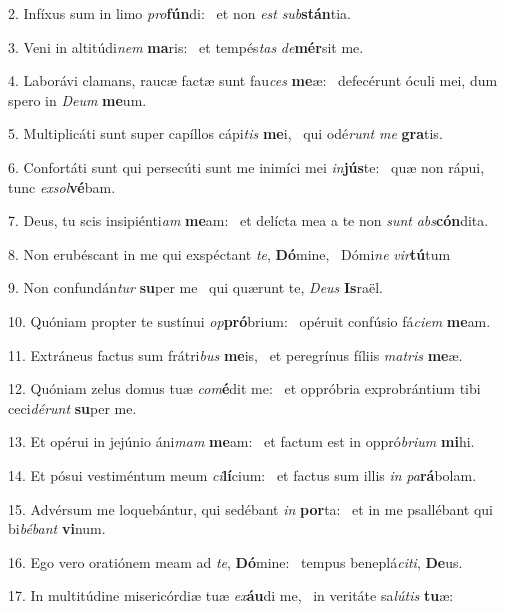 2. Infíxus sum in limo \textit{pro}\textbf{fún}di: \ast\  et non \textit{est} \textit{sub}\textbf{stán}tia.\

3. Veni in altitúdi\textit{nem} \textbf{ma}ris: \ast\  et tempés\textit{tas} \textit{de}\textbf{mér}sit me.\

4. Laborávi clamans, raucæ factæ sunt fau\textit{ces} \textbf{me}æ: \ast\  defecérunt óculi mei, dum spero in \textit{De}\textit{um} \textbf{me}um.\

5. Multiplicáti sunt super capíllos cápi\textit{tis} \textbf{me}i, \ast\  qui odé\textit{runt} \textit{me} \textbf{gra}tis.\

6. Confortáti sunt qui persecúti sunt me inimíci mei \textit{in}\textbf{jús}te: \ast\  quæ non rápui, tunc \textit{ex}\textit{sol}\textbf{vé}bam.\

7. Deus, tu scis insipiénti\textit{am} \textbf{me}am: \ast\  et delícta mea a te non \textit{sunt} \textit{abs}\textbf{cón}dita.\

8. Non erubéscant in me qui exspéctant \textit{te}, \textbf{Dó}mine, \ast\  Dómi\textit{ne} \textit{vir}\textbf{tú}tum\

9. Non confundán\textit{tur} \textbf{su}per me \ast\  qui quærunt te, \textit{De}\textit{us} \textbf{Is}raël.\

10. Quóniam propter te sustínui \textit{op}\textbf{pró}brium: \ast\  opéruit confúsio fá\textit{ci}\textit{em} \textbf{me}am.\

11. Extráneus factus sum frátri\textit{bus} \textbf{me}is, \ast\  et peregrínus fíliis \textit{ma}\textit{tris} \textbf{me}æ.\

12. Quóniam zelus domus tuæ \textit{com}\textbf{é}dit me: \ast\  et oppróbria exprobrántium tibi ceci\textit{dé}\textit{runt} \textbf{su}per me.\

13. Et opérui in jejúnio áni\textit{mam} \textbf{me}am: \ast\  et factum est in oppró\textit{bri}\textit{um} \textbf{mi}hi.\

14. Et pósui vestiméntum meum \textit{ci}\textbf{lí}cium: \ast\  et factus sum illis \textit{in} \textit{pa}\textbf{rá}bolam.\

15. Advérsum me loquebántur, qui sedébant \textit{in} \textbf{por}ta: \ast\  et in me psallébant qui bi\textit{bé}\textit{bant} \textbf{vi}num.\

16. Ego vero oratiónem meam ad \textit{te}, \textbf{Dó}mine: \ast\  tempus beneplá\textit{ci}\textit{ti}, \textbf{De}us.\

17. In multitúdine misericórdiæ tuæ \textit{ex}\textbf{áu}di me, \ast\  in veritáte sa\textit{lú}\textit{tis} \textbf{tu}æ:\

